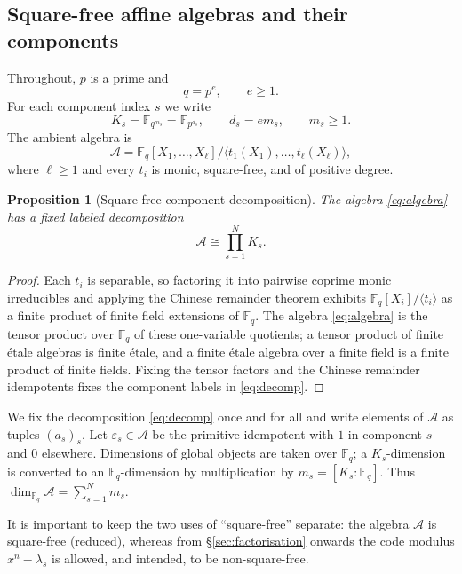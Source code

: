 \documentclass[preprint,12pt,a4paper]{elsarticle}
\newcommand{\F}{\mathbb F}
\newcommand{\A}{\mathcal A}
\newtheorem{proposition}[theorem]{Proposition}
\theoremstyle{definition}
\theoremstyle{remark}
\begin{document}
\subsection{Square-free affine algebras and their components}\label{sec:setup}

Throughout, $p$ is a prime and
\[
q=p^e,\qquad e\geq 1.
\]
For each component index $s$ we write
\[
K_s=\F_{q^{m_s}}=\F_{p^{d_s}},\qquad d_s=em_s,\qquad m_s\geq 1.
\]
The ambient algebra is
\begin{equation}\label{eq:algebra}
\A=\F_q[X_1,\ldots,X_\ell]
 \big/\langle t_1(X_1),\ldots,t_\ell(X_\ell)\rangle,
\end{equation}
where $\ell\geq1$ and every $t_i$ is monic, square-free, and of positive degree.

\begin{proposition}[Square-free component decomposition]\label{prop:decomposition}
The algebra \eqref{eq:algebra} has a fixed labeled decomposition
\begin{equation}\label{eq:decomp}
\A\cong\prod_{s=1}^{N}K_s .
\end{equation}
\end{proposition}

\begin{proof}
Each $t_i$ is separable, so factoring it into pairwise coprime monic irreducibles
and applying the Chinese remainder theorem exhibits
$\F_q[X_i]/\langle t_i\rangle$ as a finite product of finite field extensions of
$\F_q$.  The algebra \eqref{eq:algebra} is the tensor product over $\F_q$ of
these one-variable quotients; a tensor product of finite \'{e}tale algebras is
finite \'{e}tale, and a finite \'{e}tale algebra over a finite field is a finite
product of finite fields.  Fixing the tensor factors and the Chinese remainder
idempotents fixes the component labels in \eqref{eq:decomp}.
\end{proof}

We fix the decomposition \eqref{eq:decomp} once and for all and write elements of
$\A$ as tuples $(a_s)_s$.  Let $\varepsilon_s\in\A$ be the primitive idempotent
with $1$ in component $s$ and $0$ elsewhere.  Dimensions of global objects are
taken over $\F_q$; a $K_s$-dimension is converted to an $\F_q$-dimension by
multiplication by $m_s=[K_s:\F_q]$.  Thus
$\dim_{\F_q}\A=\sum_{s=1}^{N}m_s$.

It is important to keep the two uses of ``square-free'' separate: the algebra
$\A$ is square-free (reduced), whereas from \S\ref{sec:factorisation} onwards the
code modulus $x^n-\lambda_s$ is allowed, and intended, to be non-square-free.
\end{document}

